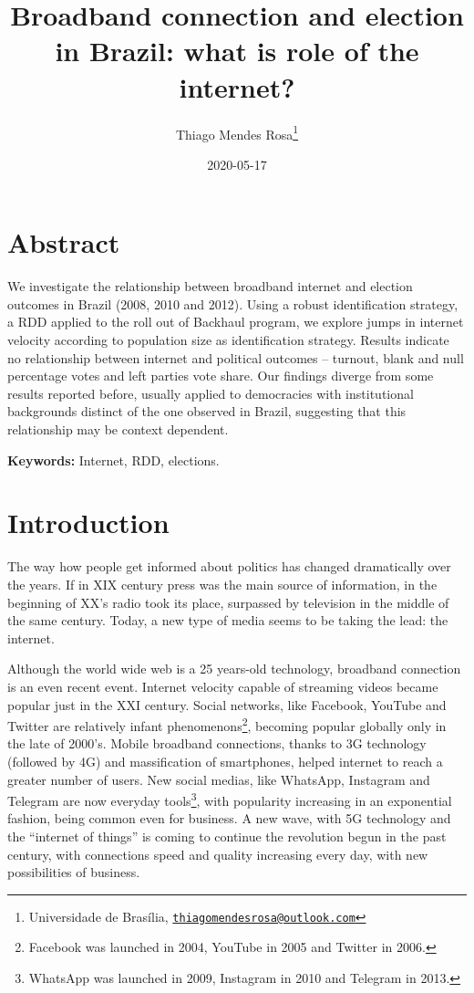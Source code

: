 \documentclass[
  12pt,
]{article}
\title{Broadband connection and election in Brazil: what is role of the
internet?}
\author{Thiago Mendes Rosa\footnote{Universidade de Brasília,
  \href{mailto:thiagomendesrosa@outlook.com}{\nolinkurl{thiagomendesrosa@outlook.com}}}}
\date{2020-05-17}
\begin{document}
\maketitle

\allsectionsfont{\centering}

\hypertarget{abstract}{%
\section*{Abstract}\label{abstract}}

We investigate the relationship between broadband internet and election
outcomes in Brazil (2008, 2010 and 2012). Using a robust identification
strategy, a RDD applied to the roll out of Backhaul program, we explore
jumps in internet velocity according to population size as
identification strategy. Results indicate no relationship between
internet and political outcomes -- turnout, blank and null percentage
votes and left parties vote share. Our findings diverge from some
results reported before, usually applied to democracies with
institutional backgrounds distinct of the one observed in Brazil,
suggesting that this relationship may be context dependent.

\textbf{Keywords:} Internet, RDD, elections.

\allsectionsfont{\raggedright}

\hypertarget{introduction}{%
\section{Introduction}\label{introduction}}

The way how people get informed about politics has changed dramatically
over the years. If in XIX century press was the main source of
information, in the beginning of XX's radio took its place, surpassed by
television in the middle of the same century. Today, a new type of media
seems to be taking the lead: the internet.

Although the world wide web is a 25 years-old technology, broadband
connection is an even recent event. Internet velocity capable of
streaming videos became popular just in the XXI century. Social
networks, like Facebook, YouTube and Twitter are relatively infant
phenomenons\footnote{Facebook was launched in 2004, YouTube in 2005 and
  Twitter in 2006.}, becoming popular globally only in the late of
2000's. Mobile broadband connections, thanks to 3G technology (followed
by 4G) and massification of smartphones, helped internet to reach a
greater number of users. New social medias, like WhatsApp, Instagram and
Telegram are now everyday tools\footnote{WhatsApp was launched in 2009,
  Instagram in 2010 and Telegram in 2013.}, with popularity increasing
in an exponential fashion, being common even for business. A new wave,
with 5G technology and the ``internet of things'' is coming to continue
the revolution begun in the past century, with connections speed and
quality increasing every day, with new possibilities of business.
\end{document}

